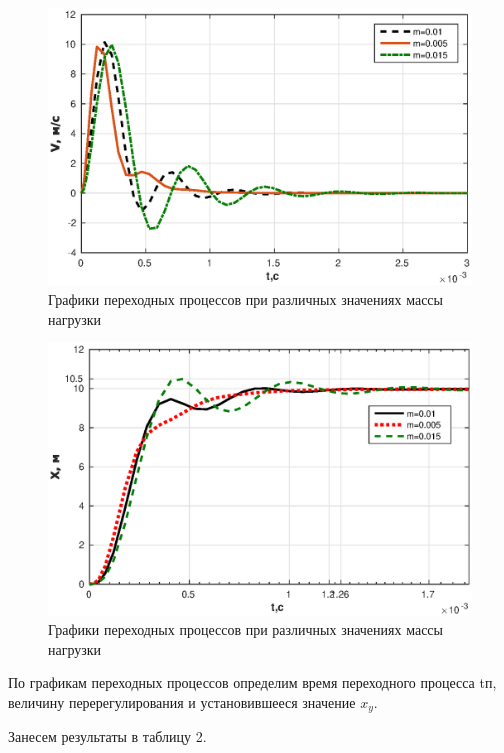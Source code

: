 \documentclass[12pt, a4paper]{article}
\begin{document}
\begin{figure}[H]
\centering
\includegraphics[width = \textwidth]{1/V2.eps}
\caption{Графики переходных процессов при различных значениях массы нагрузки}
\end{figure}

\begin{figure}[H]
\centering
\includegraphics[width = \textwidth]{1/X2.eps}
\caption{Графики переходных процессов при различных значениях массы нагрузки}
\end{figure}
\par По графикам переходных процессов определим время переходного процесса tп, величину перерегулирования  и 
установившееся значение $x_{y}$. \par Занесем результаты в таблицу 2.
\end{document}
